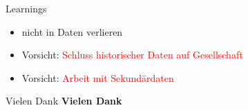 \documentclass[aspectratio=169,xcolor=dvipsnames]{beamer}
\begin{document}
\begin{frame}{Learnings}
    \begin{itemize}
        \item nicht in Daten verlieren
        \item Vorsicht: \textcolor{red}{Schluss historischer Daten auf Gesellschaft}
        \item Vorsicht: \textcolor{red}{Arbeit mit Sekundärdaten}
    \end{itemize}
\end{frame}


\begin{frame}{Vielen Dank}
    \textbf{Vielen Dank}
\end{frame}

\end{document}

